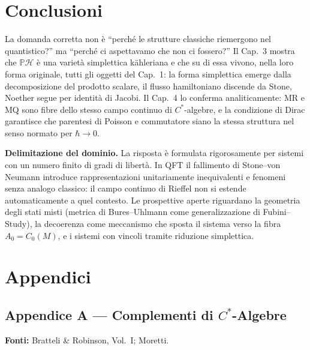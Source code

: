 \documentclass[12pt, a4paper]{article}
\newcommand{\fonti}[1]{%
	\begin{fontebox}
		\textcolor{fontecolor}{\footnotesize\textbf{Fonti:} #1}
	\end{fontebox}%
}
\begin{document}
	\newpage
	\section*{Conclusioni}
	
	La domanda corretta non è ``perché le strutture classiche riemergono nel quantistico?''
	ma ``perché ci aspettavamo che non ci fossero?'' Il Cap.~3 mostra che
	$\mathbb{P}\mathcal{H}$ è una varietà simplettica kähleriana e che su di essa vivono,
	nella loro forma originale, tutti gli oggetti del Cap.~1: la forma simplettica emerge
	dalla decomposizione del prodotto scalare, il flusso hamiltoniano discende da Stone,
	Noether segue per identità di Jacobi. Il Cap.~4 lo conferma analiticamente: MR e MQ
	sono fibre dello stesso campo continuo di $C^*$-algebre, e la condizione di Dirac
	garantisce che parentesi di Poisson e commutatore siano la stessa struttura nel senso
	normato per $\hbar\to 0$.
	
	\medskip
	
	\textbf{Delimitazione del dominio.} La risposta è formulata rigorosamente per sistemi
	con un numero finito di gradi di libertà. In QFT il fallimento di Stone--von Neumann
	introduce rappresentazioni unitariamente inequivalenti e fenomeni senza analogo classico:
	il campo continuo di Rieffel non si estende automaticamente a quel contesto. Le
	prospettive aperte riguardano la geometria degli stati misti (metrica di Bures--Uhlmann
	come generalizzazione di Fubini--Study), la decoerenza come meccanismo che sposta il
	sistema verso la fibra $A_0=C_0(M)$, e i sistemi con vincoli tramite riduzione
	simplettica.
	
	\newpage
	\section*{Appendici}
	
	\subsection*{Appendice A --- Complementi di $C^*$-Algebre}
	
	\fonti{Bratteli \& Robinson, Vol.~I; Moretti.}
	
\end{document}
